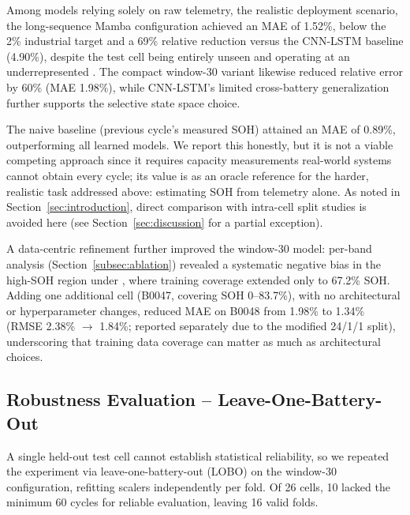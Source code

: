 Among models relying solely on raw telemetry, the realistic deployment scenario,
the long-sequence Mamba configuration achieved an MAE of 1.52\%, below the 2\%
industrial target and a 69\% relative reduction versus the CNN-LSTM baseline
(4.90\%), despite the test cell being entirely unseen and operating at an
underrepresented . The compact window-30 variant likewise reduced
relative error by 60\% (MAE 1.98\%), while CNN-LSTM's limited cross-battery
generalization further supports the selective state space choice.

The naive baseline (previous cycle's measured SOH) attained an MAE of 0.89\%,
outperforming all learned models. We report this honestly, but it is not a
viable competing approach since it requires capacity measurements real-world
systems cannot obtain every cycle; its value is as an oracle reference for the
harder, realistic task addressed above: estimating SOH from telemetry alone. As
noted in Section~\ref{sec:introduction}, direct comparison with intra-cell split
studies is avoided here (see Section~\ref{sec:discussion} for a partial
exception).

A data-centric refinement further improved the window-30 model: per-band
analysis (Section~\ref{subsec:ablation}) revealed a systematic negative bias in
the high-SOH region under , where training coverage extended only to
67.2\% SOH. Adding one additional  cell (B0047, covering SOH
0--83.7\%), with no architectural or hyperparameter changes, reduced MAE on
B0048 from 1.98\% to 1.34\% (RMSE 2.38\% $\rightarrow$ 1.84\%; reported
separately due to the modified 24/1/1 split), underscoring that training data
coverage can matter as much as architectural choices.

\subsection{Robustness Evaluation -- Leave-One-Battery-Out}
\label{subsec:lobo}

A single held-out test cell cannot establish statistical reliability, so we
repeated the experiment via leave-one-battery-out (LOBO) on the window-30
configuration, refitting scalers independently per fold. Of 26 cells, 10 lacked
the minimum 60 cycles for reliable evaluation, leaving 16 valid folds.

